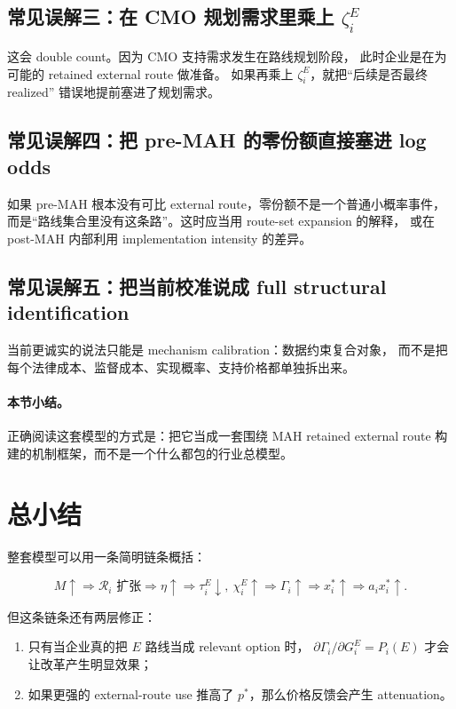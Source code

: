 \documentclass[12pt,UTF8]{ctexart}
\newcommand{\Rset}{\mathcal{R}}
\theoremstyle{plain}
\theoremstyle{remark}
\begin{document}
\subsection{常见误解三：在 CMO 规划需求里乘上 \texorpdfstring{$\zeta_i^E$}{实现概率}}

这会 double count。因为 CMO 支持需求发生在路线规划阶段，
此时企业是在为可能的 retained external route 做准备。
如果再乘上 $\zeta_i^E$，就把“后续是否最终 realized”
错误地提前塞进了规划需求。

\subsection{常见误解四：把 pre-MAH 的零份额直接塞进 log odds}

如果 pre-MAH 根本没有可比 external route，零份额不是一个普通小概率事件，
而是“路线集合里没有这条路”。这时应当用 route-set expansion 的解释，
或在 post-MAH 内部利用 implementation intensity 的差异。

\subsection{常见误解五：把当前校准说成 full structural identification}

当前更诚实的说法只能是 mechanism calibration：数据约束复合对象，
而不是把每个法律成本、监督成本、实现概率、支持价格都单独拆出来。

\paragraph{本节小结。}
正确阅读这套模型的方式是：把它当成一套围绕 MAH retained external route
构建的机制框架，而不是一个什么都包的行业总模型。

\section{总小结}

整套模型可以用一条简明链条概括：

\begin{equation}
M\uparrow
\Rightarrow
\Rset_i \text{ 扩张}
\Rightarrow
\eta\uparrow \Rightarrow
\tau_i^E\downarrow,\ \chi_i^E\uparrow
\Rightarrow
\Gamma_i\uparrow
\Rightarrow
x_i^*\uparrow
\Rightarrow
a_i x_i^*\uparrow.
\label{eq:main_chain}
\end{equation}

但这条链条还有两层修正：

\begin{enumerate}[leftmargin=2em]
    \item 只有当企业真的把 $E$ 路线当成 relevant option 时，
    $\partial\Gamma_i/\partial G_i^E=P_i(E)$ 才会让改革产生明显效果；
    \item 如果更强的 external-route use 推高了 $p^*$，那么价格反馈会产生
    attenuation。
\end{enumerate}
\end{document}
